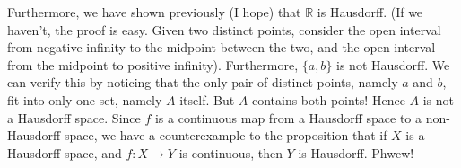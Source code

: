 \documentclass{article}
\newcommand{\R}{\mathbb{R}}
\newcommand{\R}{\mathbb{R}}
\begin{document}
\begin{itemize}
        Furthermore, we have shown previously (I hope) that $\R$ is Hausdorff. (If we haven't, the proof is easy. Given two distinct points, consider the open interval from negative infinity to the midpoint between the two, and the open interval from the midpoint to positive infinity). Furthermore, $\{a,b\}$ is not Hausdorff. We can verify this by noticing that the only pair of distinct points, namely $a$ and $b$, fit into only one set, namely $A$ itself. But $A$ contains both points! Hence $A$ is not a Hausdorff space. Since $f$ is a continuous map from a Hausdorff space to a non-Hausdorff space, we have a counterexample to the proposition that if $X$ is a Hausdorff space, and $f:X\rightarrow Y$ is continuous, then $Y$ is Hausdorff. Phwew!
    \end{itemize}
    
\end{document}
